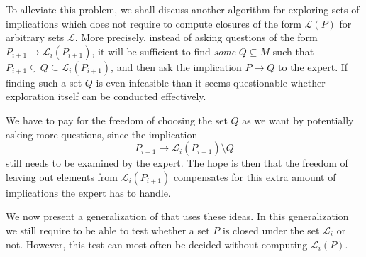 To alleviate this problem, we shall discuss another algorithm for exploring sets of
implications which does not require to compute closures of the form $\mathcal{L}(P)$ for
arbitrary sets $\mathcal{L}$.  More precisely, instead of asking questions of the form
$P_{i+1} \to \mathcal{L}_{i}(P_{i+1})$, it will be sufficient to find \emph{some} $Q
\subseteq M$ such that $P_{i+1} \subsetneq Q \subseteq \mathcal{L}_{i}(P_{i+1})$, and then
ask the implication $P \to Q$ to the expert.  If finding such a set $Q$ is even infeasible
than it seems questionable whether exploration itself can be conducted effectively.

We have to pay for the freedom of choosing the set $Q$ as we want by potentially asking
more questions, since the implication
\begin{equation*}
  P_{i+1} \to \mathcal{L}_{i}(P_{i+1}) \setminus Q
\end{equation*}
still needs to be examined by the expert.  The hope is then that the freedom of leaving
out elements from $\mathcal{L}_{i}(P_{i+1})$ compensates for this extra amount of
implications the expert has to handle.

We now present a generalization of  that uses these ideas.
In this generalization we still require to be able to test whether a set $P$ is closed
under the set $\mathcal{L}_{i}$ or not.  However, this test can most often be decided
without computing $\mathcal{L}_{i}(P)$.



